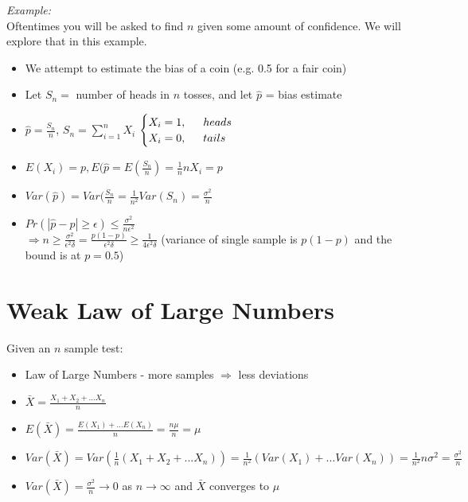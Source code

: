 \documentclass[a4paper]{article}
\begin{document}
\textit{Example:}\\
Oftentimes you will be asked to find $n$ given some amount of confidence. We will explore that in this example.
\begin{itemize}
    \item We attempt to estimate the bias of a coin (e.g. 0.5 for a fair coin)
    \item Let $S_n = $ number of heads in $n$ tosses, and let $\hat{p}$ = bias estimate
    \item $\hat{p} = \frac{S_n}{n}$, $S_n = \sum_{i=1}^{n}X_i$ 
    $\begin{cases}
        X_i = 1,\indent heads\\
        X_i = 0, \indent tails
    \end{cases}$
    \item $E(X_i) = p, E(\hat{p} = E(\frac{S_n}{n}) = \frac{1}{n}nX_i = p$
    \item $Var(\hat{p}) = Var(\frac{S_n}{n} = \frac{1}{n^2}Var(S_n) = \frac{\sigma^2}{n}$
    \item $Pr(|\hat{p} - p| \geq \epsilon) \leq \frac{\sigma^2}{n\epsilon^2}$\\
    $\Rightarrow n \geq \frac{\sigma^2}{\epsilon^2\delta} = \frac{p(1-p)}{\epsilon^2\delta} \geq \frac{1}{4\epsilon^2\delta}$ (variance of single sample is $p(1-p)$ and the bound is at $p = 0.5$)

\end{itemize}

\section{Weak Law of Large Numbers}
Given an $n$ sample test:
\begin{itemize}
    \item Law of Large Numbers - more samples $\Rightarrow$ less deviations
    \item $\bar X = \frac{X_1 + X_2 +...X_n}{n}$
    \item $E(\bar X) = \frac{E(X_1) + ...E(X_n)}{n} = \frac{n\mu}{n} = \mu$
    \item $Var(\bar X) = Var(\frac{1}{n} (X_1 + X_2 + ... X_n)) = \frac{1}{n^2}(Var(X_1) + ... Var(X_n)) = \frac{1}{n^2}n\sigma^2 = \frac{\sigma^2}{n}$
    \item $Var(\bar X) = \frac{\sigma^2}{n} \rightarrow 0$ as $n \rightarrow \infty$ and $\bar X $ converges to $\mu$
\end{itemize}
\end{document}
